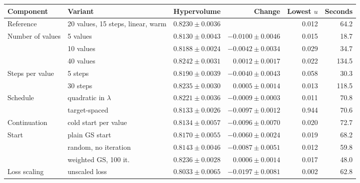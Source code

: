 \begin{tabular}{@{}llrrrr@{}}
\toprule
Component & Variant & Hypervolume & Change & Lowest $u$ & Seconds \\
\midrule
Reference & 20 values, 15 steps, linear, warm & $0.8230\pm0.0036$ &  & 0.012 & 64.2 \\
Number of values & 5 values & $0.8130\pm0.0043$ & $-0.0100\pm0.0046$ & 0.015 & 18.7 \\
 & 10 values & $0.8188\pm0.0024$ & $-0.0042\pm0.0034$ & 0.029 & 34.7 \\
 & 40 values & $0.8242\pm0.0031$ & $0.0012\pm0.0017$ & 0.022 & 134.5 \\
Steps per value & 5 steps & $0.8190\pm0.0039$ & $-0.0040\pm0.0043$ & 0.058 & 30.3 \\
 & 30 steps & $0.8235\pm0.0030$ & $0.0005\pm0.0014$ & 0.013 & 118.5 \\
Schedule & quadratic in $\lambda$ & $0.8221\pm0.0036$ & $-0.0009\pm0.0003$ & 0.011 & 70.8 \\
 & target-spaced & $0.8133\pm0.0026$ & $-0.0097\pm0.0012$ & 0.944 & 70.6 \\
Continuation & cold start per value & $0.8134\pm0.0057$ & $-0.0096\pm0.0070$ & 0.020 & 72.7 \\
Start & plain GS start & $0.8170\pm0.0055$ & $-0.0060\pm0.0024$ & 0.019 & 68.2 \\
 & random, no iteration & $0.8143\pm0.0046$ & $-0.0087\pm0.0051$ & 0.012 & 59.8 \\
 & weighted GS, 100 it. & $0.8236\pm0.0028$ & $0.0006\pm0.0014$ & 0.017 & 48.0 \\
Loss scaling & unscaled loss & $0.8033\pm0.0065$ & $-0.0197\pm0.0081$ & 0.002 & 62.8 \\
\bottomrule
\end{tabular}
